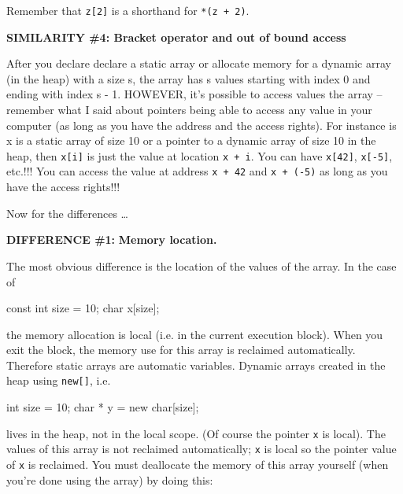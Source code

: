 Remember that \texttt{z[2]} is a shorthand for \texttt{*(z + 2)}.

\textbf{SIMILARITY \#4: Bracket operator and out of bound access}                      

After you declare declare a static array or allocate memory for a dynamic array (in the heap) with a size s, the array has s values starting with index 0 and ending with index s - 1. HOWEVER, it's possible to access values  the array -- remember what I said about pointers being able to access any value in your computer (as long as you have the address and the access rights). For instance is x is a static array of size 10 or a pointer to a dynamic array of size 10 in the heap, then \texttt{x[i]} is just the value at location \texttt{x + i}. You can have \texttt{x[42]}, \texttt{x[-5]}, etc.!!! You can access the value at address \texttt{x + 42} and \texttt{x + (-5)} as long as you have the access rights!!!

Now for the differences \ldots{}

\textbf{DIFFERENCE \#1:} \textbf{Memory location.}

The most obvious difference is the location of the values of the array.
In the case of

\begin{consolethree}[escapeinside=||]
const int size = 10;
char x[size];
\end{consolethree}

the memory allocation is local (i.e. in the current execution block).
When you exit the block, the memory use for this array is reclaimed
automatically. Therefore static arrays are automatic variables. Dynamic
arrays created in the heap using \texttt{new[]}, i.e.

\begin{consolethree}[escapeinside=||]
int size = 10;
char * y = new char[size];
\end{consolethree}

lives in the heap, not in the local scope. (Of course the pointer
\texttt{x} is local). The values of this array is not reclaimed
automatically; \texttt{x} is local so the pointer value of \texttt{x} is
reclaimed. You must deallocate the memory of this array yourself (when
you're done using the array) by doing this:

